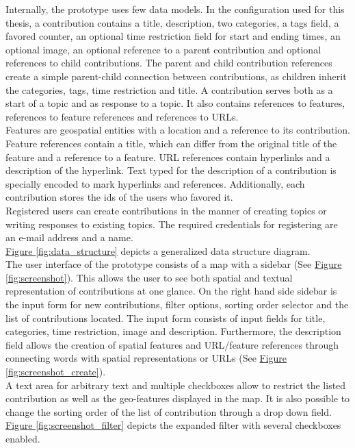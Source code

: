 Internally, the prototype uses few data models. In the configuration used for this thesis, a contribution contains a title, description, two categories, a tags field, a favored counter, an optional time restriction field for start and ending times, an optional image, an optional reference to a parent contribution and optional references to child contributions. The parent and child contribution references create a simple parent-child connection between contributions, as children inherit the categories, tags, time restriction and title. A contribution serves both as a start of a topic and as response to a topic. It also contains references to features, references to feature references and references to URLs.\\
Features are geospatial entities with a location and a reference to its contribution.\\
Feature references contain a title, which can differ from the original title of the feature and a reference to a feature. URL references contain hyperlinks and a description of the hyperlink. Text typed for the description of a contribution is specially encoded to mark hyperlinks and references. Additionally, each contribution stores the ids of the users who favored it.\\
Registered users can create contributions in the manner of creating topics or writing responses to existing topics. The required credentials for registering are an e-mail address and a name.\\
\hyperref[fig:data_structure]{Figure \ref{fig:data_structure}} depicts a generalized data structure diagram.\\
The user interface of the prototype consists of a map with a sidebar (See \hyperref[fig:screenshot]{Figure \ref{fig:screenshot}}). This allows the user to see both spatial and textual representation of contributions at one glance. On the right hand side sidebar is the input form for new contributions, filter options, sorting order selector and the list of contributions located. The input form consists of input fields for title, categories, time restriction, image and description. Furthermore, the description field allows the creation of spatial features and URL/feature references through connecting words with spatial representations or URLs (See \hyperref[fig:screenshot_create]{Figure \ref{fig:screenshot_create}}).\\
A text area for arbitrary text and multiple checkboxes allow to restrict the listed contribution as well as the geo-features displayed in the map. It is also possible to change the sorting order of the list of contribution through a drop down field. \hyperref[fig:screenshot_filter]{Figure \ref{fig:screenshot_filter}} depicts the expanded filter with several checkboxes enabled.\\
